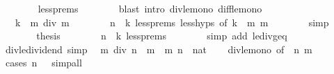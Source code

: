 \begin{isabellebody}
\ \ \ \ \ \ \isamarkupfalse%
\ less{\isachardot}{\kern0pt}prems\isanewline
\ \ \ \ \ \ \isamarkupfalse%
\ {\isacharparenleft}{\kern0pt}blast\ intro{\isacharcolon}{\kern0pt}\ div{\isacharunderscore}{\kern0pt}le{\isacharunderscore}{\kern0pt}mono\ diff{\isacharunderscore}{\kern0pt}le{\isacharunderscore}{\kern0pt}mono{}{\isacharparenright}{\kern0pt}\isanewline
\ \ \ \ \isamarkupfalse%
\ \isamarkupfalse%
\ {\isachardoublequoteopen}{\isasymdots}\ {\isasymle}\ {\isacharparenleft}{\kern0pt}k\ {\isacharminus}{\kern0pt}\ m{\isacharparenright}{\kern0pt}\ div\ m{\isachardoublequoteclose}\isanewline
\ \ \ \ \ \ \isamarkupfalse%
\ {\isacartoucheopen}n\ {\isasymle}\ k{\isacartoucheclose}\ less{\isachardot}{\kern0pt}prems\ less{\isachardot}{\kern0pt}hyps\ {\isacharbrackleft}{\kern0pt}of\ {\isachardoublequoteopen}k\ {\isacharminus}{\kern0pt}\ m{\isachardoublequoteclose}\ m{\isacharbrackright}{\kern0pt}\isanewline
\ \ \ \ \ \ \isamarkupfalse%
\ simp\isanewline
\ \ \ \ \isamarkupfalse%
\ \isamarkupfalse%
\ {\isacharquery}{\kern0pt}thesis\isanewline
\ \ \ \ \ \ \isamarkupfalse%
\ {\isacartoucheopen}n\ {\isasymle}\ k{\isacartoucheclose}\ less{\isachardot}{\kern0pt}prems\isanewline
\ \ \ \ \ \ \isamarkupfalse%
\ {\isacharparenleft}{\kern0pt}simp\ add{\isacharcolon}{\kern0pt}\ le{\isacharunderscore}{\kern0pt}div{\isacharunderscore}{\kern0pt}geq{\isacharparenright}{\kern0pt}\isanewline
\ \ \isamarkupfalse%
\isanewline
{}\isamarkupfalse%
%
\endisatagproof
{\isafoldproof}%
%
\isadelimproof
\isanewline
%
\endisadelimproof
\isanewline
{}\isamarkupfalse%
\ div{\isacharunderscore}{\kern0pt}le{\isacharunderscore}{\kern0pt}dividend\ {\isacharbrackleft}{\kern0pt}simp{\isacharbrackright}{\kern0pt}{\isacharcolon}{\kern0pt}\isanewline
\ \ {\isachardoublequoteopen}m\ div\ n\ {\isasymle}\ m{\isachardoublequoteclose}\ \ m\ n\ {\isacharcolon}{\kern0pt}{\isacharcolon}{\kern0pt}\ nat\isanewline
%
\isadelimproof
\ \ %
\endisadelimproof
%
\isatagproof
{}\isamarkupfalse%
\ div{\isacharunderscore}{\kern0pt}le{\isacharunderscore}{\kern0pt}mono{}\ {\isacharbrackleft}{\kern0pt}of\ {}\ n\ m{\isacharbrackright}{\kern0pt}\ \isamarkupfalse%
\ {\isacharparenleft}{\kern0pt}cases\ {\isachardoublequoteopen}n\ {\isacharequal}{\kern0pt}\ {}{\isachardoublequoteclose}{\isacharparenright}{\kern0pt}\ simp{\isacharunderscore}{\kern0pt}all%

\end{isabellebody}
